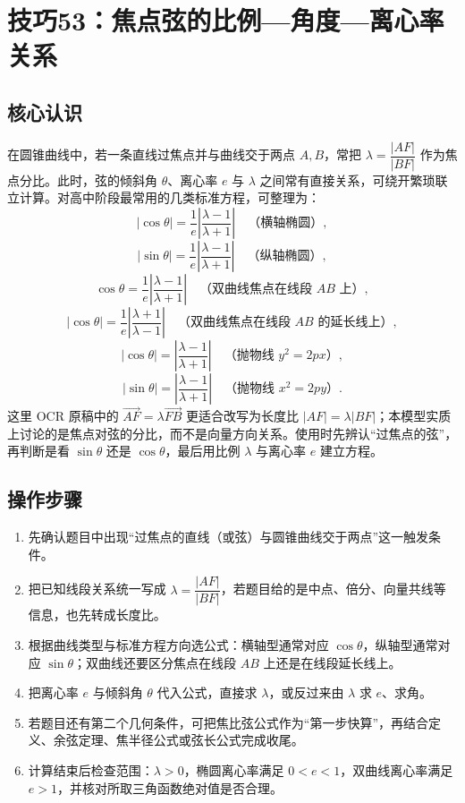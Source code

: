 \documentclass[UTF8,a4paper,11pt]{ctexart}
\begin{document}
\clearpage

\section{技巧53：焦点弦的比例—角度—离心率关系}

\subsection*{核心认识}

在圆锥曲线中，若一条直线过焦点并与曲线交于两点 $A,B$，常把 $\lambda=\dfrac{|AF|}{|BF|}$ 作为焦点分比。此时，弦的倾斜角 $\theta$、离心率 $e$ 与 $\lambda$ 之间常有直接关系，可绕开繁琐联立计算。对高中阶段最常用的几类标准方程，可整理为：
\[
\left|\cos\theta\right|=\frac{1}{e}\left|\frac{\lambda-1}{\lambda+1}\right|\quad\text{（横轴椭圆）},
\]
\[
\left|\sin\theta\right|=\frac{1}{e}\left|\frac{\lambda-1}{\lambda+1}\right|\quad\text{（纵轴椭圆）},
\]
\[
\cos\theta=\frac{1}{e}\left|\frac{\lambda-1}{\lambda+1}\right|\quad\text{（双曲线焦点在线段 }AB\text{ 上）},
\]
\[
\left|\cos\theta\right|=\frac{1}{e}\left|\frac{\lambda+1}{\lambda-1}\right|\quad\text{（双曲线焦点在线段 }AB\text{ 的延长线上）},
\]
\[
\left|\cos\theta\right|=\left|\frac{\lambda-1}{\lambda+1}\right|\quad\text{（抛物线 }y^2=2px\text{）},
\]
\[
\left|\sin\theta\right|=\left|\frac{\lambda-1}{\lambda+1}\right|\quad\text{（抛物线 }x^2=2py\text{）}.
\]
这里 OCR 原稿中的 $\overrightarrow{AF}=\lambda\overrightarrow{FB}$ 更适合改写为长度比 $|AF|=\lambda|BF|$；本模型实质上讨论的是焦点对弦的分比，而不是向量方向关系。使用时先辨认“过焦点的弦”，再判断是看 $\sin\theta$ 还是 $\cos\theta$，最后用比例 $\lambda$ 与离心率 $e$ 建立方程。

\subsection*{操作步骤}

\begin{enumerate}

\item 先确认题目中出现“过焦点的直线（或弦）与圆锥曲线交于两点”这一触发条件。

\item 把已知线段关系统一写成 $\lambda=\dfrac{|AF|}{|BF|}$，若题目给的是中点、倍分、向量共线等信息，也先转成长度比。

\item 根据曲线类型与标准方程方向选公式：横轴型通常对应 $\cos\theta$，纵轴型通常对应 $\sin\theta$；双曲线还要区分焦点在线段 $AB$ 上还是在线段延长线上。

\item 把离心率 $e$ 与倾斜角 $\theta$ 代入公式，直接求 $\lambda$，或反过来由 $\lambda$ 求 $e$、求角。

\item 若题目还有第二个几何条件，可把焦比弦公式作为“第一步快算”，再结合定义、余弦定理、焦半径公式或弦长公式完成收尾。

\item 计算结束后检查范围：$\lambda>0$，椭圆离心率满足 $0<e<1$，双曲线离心率满足 $e>1$，并核对所取三角函数绝对值是否合理。

\end{enumerate}
\end{document}
